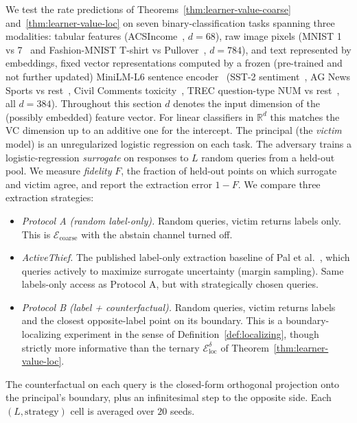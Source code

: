 \documentclass[runningheads,envcountsame]{llncs}
\newcommand{\cE}{\mathcal{E}}
\newcommand{\R}{\mathbb{R}}
\begin{document}
We test the rate predictions of Theorems~\ref{thm:learner-value-coarse} and~\ref{thm:learner-value-loc} on seven binary-classification tasks spanning three modalities: tabular features (ACSIncome~\cite{ding2021folktables}, $d=68$), raw image pixels (MNIST 1 vs 7~\cite{lecun1998gradient} and Fashion-MNIST T-shirt vs Pullover~\cite{xiao2017fashion}, $d=784$), and text represented by embeddings, fixed vector representations computed by a frozen (pre-trained and not further updated) MiniLM-L6 sentence encoder~\cite{wang2020minilm} (SST-2 sentiment~\cite{socher2013recursive}, AG News Sports vs rest~\cite{zhang2015character}, Civil Comments toxicity~\cite{borkan2019nuanced}, TREC question-type NUM vs rest~\cite{li2002learning}, all $d=384$). Throughout this section $d$ denotes the input dimension of the (possibly embedded) feature vector. For linear classifiers in $\R^d$ this matches the VC dimension up to an additive one for the intercept. The principal (the \emph{victim} model) is an unregularized logistic regression on each task. The adversary trains a logistic-regression \emph{surrogate} on responses to $L$ random queries from a held-out pool. We measure \emph{fidelity} $F$, the fraction of held-out points on which surrogate and victim agree, and report the extraction error $1 - F$. We compare three extraction strategies:
\begin{itemize}[nosep]
\item \emph{Protocol A (random label-only).} Random queries, victim returns labels only. This is $\cE_{\mathrm{coarse}}$ with the abstain channel turned off.
\item \emph{ActiveThief.} The published label-only extraction baseline of Pal et al.~\cite{pal2020activethief}, which queries actively to maximize surrogate uncertainty (margin sampling). Same labels-only access as Protocol A, but with strategically chosen queries.
\item \emph{Protocol B (label + counterfactual).} Random queries, victim returns labels and the closest opposite-label point on its boundary. This is a boundary-localizing experiment in the sense of Definition~\ref{def:localizing}, though strictly more informative than the ternary $\cE_{\mathrm{loc}}^\delta$ of Theorem~\ref{thm:learner-value-loc}.
\end{itemize}

The counterfactual on each query is the closed-form orthogonal projection onto the principal's boundary, plus an infinitesimal step to the opposite side. Each $(L, \text{strategy})$ cell is averaged over $20$ seeds.
\end{document}

